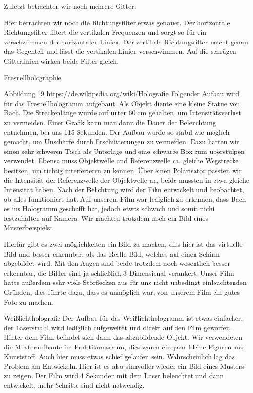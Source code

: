 Zuletzt betrachten wir noch mehrere Gitter:

Hier betrachten wir noch die Richtungsfilter etwas genauer.
Der horizontale Richtungsfilter filtert die vertikalen Frequenzen und sorgt so für ein verschwimmen der horizontalen Linien. Der vertikale Richtungsfilter macht genau das Gegenteil und lässt die vertikalen Linien verschwimmen. Auf die schrägen Gitterlinien wirken beide Filter gleich.

Fresnellholographie

Abbildung 19 https://de.wikipedia.org/wiki/Holografie
Folgender Aufbau wird für das Fresnellhologramm aufgebaut. Als Objekt diente eine kleine Statue von Bach. Die Streckenlänge wurde auf unter 60 cm gehalten, um Intensitätsverlust zu vermeiden. Einer Grafik kann man dann die Dauer der Beleuchtung entnehmen, bei uns 115 Sekunden. Der Aufbau wurde so stabil wie möglich gemacht, um Unschärfe durch Erschütterungen zu vermeiden. Dazu hatten wir einen sehr schweren Tisch als Unterlage und eine schwarze Box zum überstülpen verwendet. Ebenso muss Objektwelle und Referenzwelle ca. gleiche Wegstrecke besitzen, um richtig interferieren zu können. Über einen Polarisator passten wir die Intensität der Referenzwelle der Objektwelle an, beide mussten in etwa gleiche Intensität haben.
Nach der Belichtung wird der Film entwickelt und beobachtet, ob alles funktioniert hat. Auf unserem Film war lediglich zu erkennen, dass Bach es ins Hologramm geschafft hat, jedoch etwas schwach und somit nicht festzuhalten auf Kamera. Wir machten trotzdem noch ein Bild eines Musterbeispiels:


Hierfür gibt es zwei möglichkeiten ein Bild zu machen, dies hier ist das virtuelle Bild und besser erkennbar, als das Reelle Bild, welches auf einen Schirm abgebildet wird. Mit den Augen sind beide trotzdem noch wesentlich besser erkennbar, die Bilder sind ja schließlich 3 Dimensional verankert.
Unser Film hatte außerdem sehr viele Störflecken aus für uns nicht unbedingt einleuchtenden Gründen, dies führte dazu, dass es unmöglich war, von unserem Film ein gutes Foto zu machen.

Weißlichtholografie
Der Aufbau für das Weißlichthologramm ist etwas einfacher, der Laserstrahl wird lediglich aufgeweitet und direkt auf den Film geworfen. Hinter dem Film befindet sich dann das abzubildende Objekt. Wir verwendeten die Musteraufbaute im Praktikumsraum, dies waren ein paar kleine Figuren aus Kunststoff. Auch hier muss etwas schief gelaufen sein. Wahrscheinlich lag das Problem am Entwickeln. Hier ist es also sinnvoller wieder ein Bild eines Musters zu zeigen. Der Film wird 4 Sekunden mit dem Laser beleuchtet und dann entwickelt, mehr Schritte sind nicht notwendig. 
